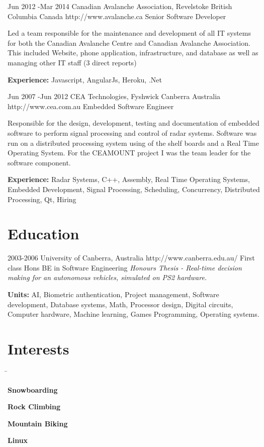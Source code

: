 \documentclass{article}
\begin{document}
\begin{job}
{Jun 2012 -}{Mar 2014}
{Canadian Avalanche Association, Revelstoke British Columbia Canada}
{http://www.avalanche.ca}
{Senior Software Developer}%
{Led a team responsible for the maintenance and development of all IT systems for both the Canadian Avalanche Centre and Canadian Avalanche Association. This included Website, phone application, infrastructure, and database as well as managing other IT staff (3 direct reports)\\
\rule{0mm}{5mm}\textbf{Experience:} Javascript, AngularJs, Heroku, .Net} 
\end{job}

\begin{job}
{Jun 2007 -}{Jun 2012}
{CEA Technologies, Fyshwick Canberra Australia}
{http://www.cea.com.au}
{Embedded Software Engineer}%
{Responsible for the design, development, testing and documentation of embedded software to perform signal processing and control of radar systems. Software was run on a distributed processing system using of the shelf boards and a Real Time Operating System. For the CEAMOUNT project I was the team leader for the software component.\\
\rule{0mm}{5mm}\textbf{Experience:} Radar Systems, C++, Assembly, Real Time Operating Systems, Embedded Development, Signal Processing, Scheduling, Concurrency, Distributed Processing, Qt, Hiring} 
\end{job}

\section*{Education}

\begin{education}
{2003-2006}
{University of Canberra, Australia} 
{http://www.canberra.edu.au/} 
{First class Hons BE in Software Engineering}%
\textit{Honours Thesis - Real-time decision making for an autonomous vehicles, simulated
on PS2 hardware.}\\
\rule{0mm}{5mm}\textbf{Units:} {AI, Biometric authentication, Project management, Software development, Database systems, Math, Processor design, Digital circuits, Computer hardware, Machine learning, Games Programming, Operating systems.} 
\end{education}

\section*{Interests}

\begin{tabbing}
\hspace{5mm} \= \kill
\rule{0mm}{4mm}\sqbullet \> \textbf{Snowboarding}\\
\rule{0mm}{4mm}\sqbullet \> \textbf{Rock Climbing} \\
\rule{0mm}{4mm}\sqbullet \> \textbf{Mountain Biking} \\
\rule{0mm}{4mm}\sqbullet \> \textbf{Linux} \\
\end{tabbing}
\end{document}
